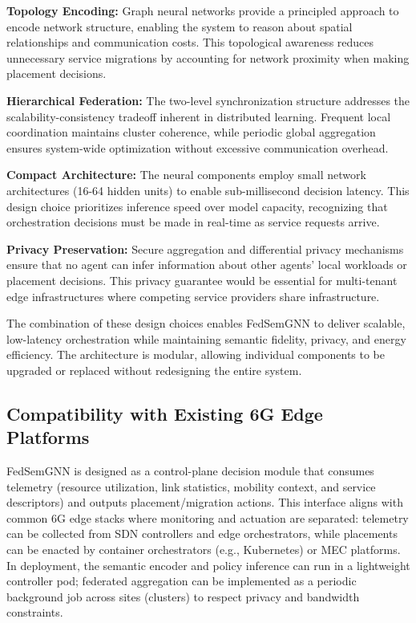 \documentclass[conference]{IEEEtran}
\begin{document}
		\textbf{Topology Encoding:} Graph neural networks provide a principled approach to encode network structure, enabling the system to reason about spatial relationships and communication costs. This topological awareness reduces unnecessary service migrations by accounting for network proximity when making placement decisions.
		
		\textbf{Hierarchical Federation:} The two-level synchronization structure addresses the scalability-consistency tradeoff inherent in distributed learning. Frequent local coordination maintains cluster coherence, while periodic global aggregation ensures system-wide optimization without excessive communication overhead.
		
		\textbf{Compact Architecture:} The neural components employ small network architectures (16-64 hidden units) to enable sub-millisecond decision latency. This design choice prioritizes inference speed over model capacity, recognizing that orchestration decisions must be made in real-time as service requests arrive.
		
		\textbf{Privacy Preservation:} Secure aggregation and differential privacy mechanisms ensure that no agent can infer information about other agents' local workloads or placement decisions. This privacy guarantee would be essential for multi-tenant edge infrastructures where competing service providers share infrastructure.
		
		The combination of these design choices enables FedSemGNN to deliver scalable, low-latency orchestration while maintaining semantic fidelity, privacy, and energy efficiency. The architecture is modular, allowing individual components to be upgraded or replaced without redesigning the entire system.
		
		\subsection{Compatibility with Existing 6G Edge Platforms}
		FedSemGNN is designed as a control-plane decision module that consumes telemetry (resource utilization, link statistics, mobility context, and service descriptors) and outputs placement/migration actions. This interface aligns with common 6G edge stacks where monitoring and actuation are separated: telemetry can be collected from SDN controllers and edge orchestrators, while placements can be enacted by container orchestrators (e.g., Kubernetes) or MEC platforms. In deployment, the semantic encoder and policy inference can run in a lightweight controller pod; federated aggregation can be implemented as a periodic background job across sites (clusters) to respect privacy and bandwidth constraints.
		
\end{document}
